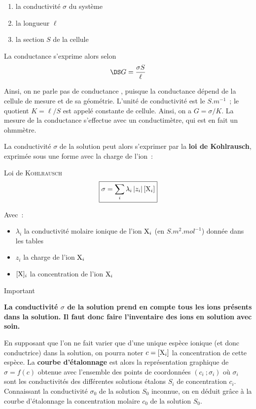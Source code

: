 \documentclass[a4paper, 11pt, final, garamond]{book}
\begin{document}
\begin{enumerate}
    \item la conductivité $\sigma$ du système
    \item la longueur $\ell$
    \item la section $S$ de la cellule
\end{enumerate}

La conductance s'exprime alors selon
\[\DS G = \frac{\sigma S}{\ell}\]

Ainsi, on ne parle pas de conductance , puisque la
conductance dépend de la cellule de mesure et de sa géométrie. L'unité de
conductivité est le $\si{S.m^{-1}}$~; le quotient $K = \ell / S$ est appelé
constante de cellule. Ainsi, on a $G = \sigma / K$. La mesure de la conductance
s'effectue avec un conductimètre, qui est en fait un ohmmètre.\bigbreak

La conductivité $\sigma$ de la solution peut alors s'exprimer par la \textbf{loi
de Kohlrausch}, exprimée sous une forme avec la charge de l'ion~:
\begin{rprop}{Loi de \textsc{Kohlrausch}}
    \[\boxed{\sigma = \sum_{i} \lambda_i \left|z_i\right| [{\rm X}_i]}\]

    Avec~:
    \begin{itemize}
        \item $\lambda_i$ la conductivité molaire ionique de l'ion ${\rm X}_i$ (en
            $\si{S.m^2.mol^{-1}}$) donnée dans les tables
        \item $z_i$ la charge de l'ion ${\rm X}_i$
        \item $[{\rm X}]_i$ la concentration de l'ion ${\rm X}_i$
    \end{itemize}
\end{rprop}

\begin{rror}{Important}
    \begin{center}
        \bfseries
        La conductivité $\sigma$ de la solution prend en compte tous les ions
        présents dans la solution. Il faut donc faire l'inventaire des ions en
        solution avec soin.
    \end{center}
\end{rror}

En supposant que l'on ne fait varier que d'une unique espèce ionique (et donc
conductrice) dans la solution, on pourra noter $c = [{\rm X}_i]$ la concentration de cette espèce.
La \textbf{courbe d'étalonnage} est alors la représentation graphique de $\sigma = f(c)$ obtenue avec l'ensemble des points de coordonnées $(c_i~; \sigma_i)$ où $\sigma_i$ sont les conductivités des différentes solutions étalons $S_i$ de concentration $c_i$. Connaissant la conductivité $\sigma_0$ de la solution $S_0$ inconnue, on en déduit grâce à la courbe d'étalonnage la concentration molaire $c_0$ de la solution $S_0$.
\end{document}
